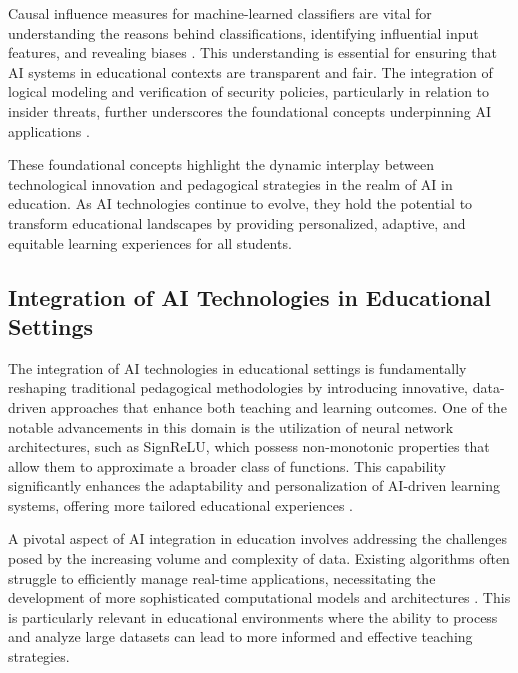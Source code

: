 Causal influence measures for machine-learned classifiers are vital for understanding the reasons behind classifications, identifying influential input features, and revealing biases \cite{sen2018supervisingfeatureinfluence}. This understanding is essential for ensuring that AI systems in educational contexts are transparent and fair. The integration of logical modeling and verification of security policies, particularly in relation to insider threats, further underscores the foundational concepts underpinning AI applications \cite{kammller2020applyingisabelleinsiderframework}.



These foundational concepts highlight the dynamic interplay between technological innovation and pedagogical strategies in the realm of AI in education. As AI technologies continue to evolve, they hold the potential to transform educational landscapes by providing personalized, adaptive, and equitable learning experiences for all students.



\subsection{Integration of AI Technologies in Educational Settings} \label{subsec:Integration of AI Technologies in Educational Settings}



The integration of AI technologies in educational settings is fundamentally reshaping traditional pedagogical methodologies by introducing innovative, data-driven approaches that enhance both teaching and learning outcomes. One of the notable advancements in this domain is the utilization of neural network architectures, such as SignReLU, which possess non-monotonic properties that allow them to approximate a broader class of functions. This capability significantly enhances the adaptability and personalization of AI-driven learning systems, offering more tailored educational experiences \cite{li2023signreluneuralnetworkapproximation}.



A pivotal aspect of AI integration in education involves addressing the challenges posed by the increasing volume and complexity of data. Existing algorithms often struggle to efficiently manage real-time applications, necessitating the development of more sophisticated computational models and architectures \cite{ramasubramanian2009teachingresultanalysisusing}. This is particularly relevant in educational environments where the ability to process and analyze large datasets can lead to more informed and effective teaching strategies.



